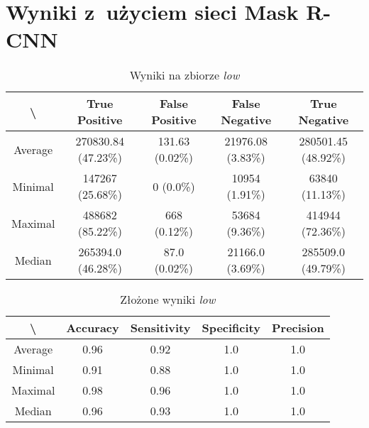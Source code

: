 \newpage
\section{Wyniki z~użyciem sieci Mask R-CNN}

\begin{table}[!h]
	\centering
	\caption{Wyniki na zbiorze \textit{low}}
	\vspace{6pt}
	{\footnotesize
		\begin{tabular}{|c|c|c|c|c|}
			\hline \textbackslash & True Positive & False Positive & False Negative & True Negative \\
      \hline Average & 270830.84 (47.23\%) & 131.63 (0.02\%) & 21976.08 (3.83\%) & 280501.45 (48.92\%) \\
      \hline Minimal & 147267 (25.68\%) & 0 (0.0\%) & 10954 (1.91\%) & 63840 (11.13\%) \\
      \hline Maximal & 488682 (85.22\%) & 668 (0.12\%) & 53684 (9.36\%) & 414944 (72.36\%) \\
      \hline Median & 265394.0 (46.28\%) & 87.0 (0.02\%) & 21166.0 (3.69\%) & 285509.0 (49.79\%) \\
      \hline
		\end{tabular}
	}
	\vspace{0pt}
\end{table}

\vspace{1cm}

\begin{table}[!h]
	\centering
	\caption{Złożone wyniki \textit{low}}
	\vspace{6pt}
	{\footnotesize
		\begin{tabular}{|c|c|c|c|c|}
			\hline \textbackslash & Accuracy & Sensitivity & Specificity & Precision \\
      \hline Average & 0.96 & 0.92 & 1.0 & 1.0 \\
      \hline Minimal & 0.91 & 0.88 & 1.0 & 1.0 \\
      \hline Maximal & 0.98 & 0.96 & 1.0 & 1.0 \\
      \hline Median & 0.96 & 0.93 & 1.0 & 1.0 \\
      \hline
		\end{tabular}
	}
	\vspace{0pt}
\end{table}



